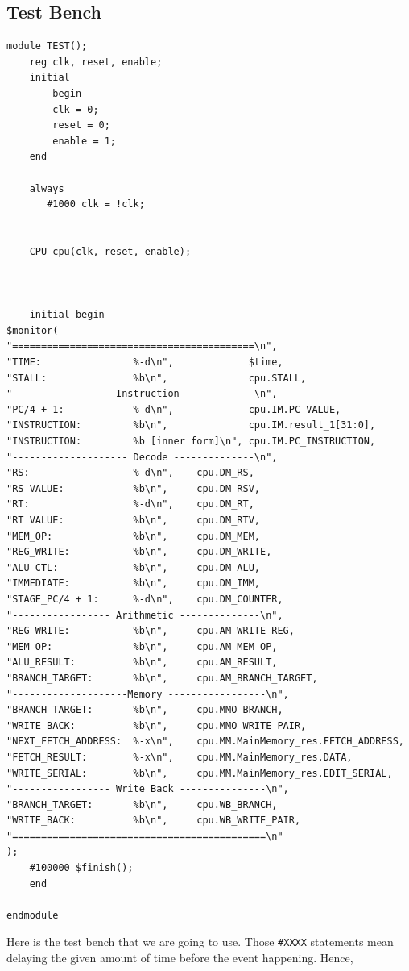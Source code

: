 \documentclass[a4paper,12pt, oneside]{book}
\begin{document}
\subsection{Test Bench}
\begin{verbatim}
module TEST();
    reg clk, reset, enable;
    initial 
        begin
        clk = 0;
        reset = 0;
        enable = 1;
    end

    always
       #1000 clk = !clk;


    CPU cpu(clk, reset, enable);



    initial begin
$monitor(
"==========================================\n",
"TIME:                %-d\n",             $time, 
"STALL:               %b\n",              cpu.STALL,
"----------------- Instruction ------------\n",
"PC/4 + 1:            %-d\n",             cpu.IM.PC_VALUE,
"INSTRUCTION:         %b\n",              cpu.IM.result_1[31:0],
"INSTRUCTION:         %b [inner form]\n", cpu.IM.PC_INSTRUCTION,
"-------------------- Decode --------------\n",
"RS:                  %-d\n",    cpu.DM_RS,
"RS VALUE:            %b\n",     cpu.DM_RSV,
"RT:                  %-d\n",    cpu.DM_RT,
"RT VALUE:            %b\n",     cpu.DM_RTV,
"MEM_OP:              %b\n",     cpu.DM_MEM,
"REG_WRITE:           %b\n",     cpu.DM_WRITE,
"ALU_CTL:             %b\n",     cpu.DM_ALU,
"IMMEDIATE:           %b\n",     cpu.DM_IMM,
"STAGE_PC/4 + 1:      %-d\n",    cpu.DM_COUNTER,
"----------------- Arithmetic --------------\n",
"REG_WRITE:           %b\n",     cpu.AM_WRITE_REG,
"MEM_OP:              %b\n",     cpu.AM_MEM_OP,
"ALU_RESULT:          %b\n",     cpu.AM_RESULT,
"BRANCH_TARGET:       %b\n",     cpu.AM_BRANCH_TARGET,
"--------------------Memory -----------------\n",
"BRANCH_TARGET:       %b\n",     cpu.MMO_BRANCH,
"WRITE_BACK:          %b\n",     cpu.MMO_WRITE_PAIR,
"NEXT_FETCH_ADDRESS:  %-x\n",    cpu.MM.MainMemory_res.FETCH_ADDRESS,
"FETCH_RESULT:        %-x\n",    cpu.MM.MainMemory_res.DATA,
"WRITE_SERIAL:        %b\n",     cpu.MM.MainMemory_res.EDIT_SERIAL,
"----------------- Write Back ---------------\n",
"BRANCH_TARGET:       %b\n",     cpu.WB_BRANCH,
"WRITE_BACK:          %b\n",     cpu.WB_WRITE_PAIR,
"============================================\n"
);
    #100000 $finish();
    end

endmodule
\end{verbatim}
Here is the test bench that we are going to use. Those \texttt{#XXXX} statements mean delaying the given amount of time before the event happening. Hence,
\end{document}
